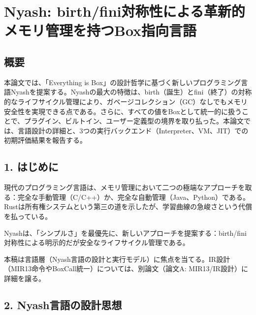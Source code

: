 \documentclass[
]{article}
\author{}
\date{}
\begin{document}
\hypertarget{nyash-birthfiniux5bfeux79f0ux6027ux306bux3088ux308bux9769ux65b0ux7684ux30e1ux30e2ux30eaux7ba1ux7406ux3092ux6301ux3064boxux6307ux5411ux8a00ux8a9e}{%
\section{Nyash:
birth/fini対称性による革新的メモリ管理を持つBox指向言語}\label{nyash-birthfiniux5bfeux79f0ux6027ux306bux3088ux308bux9769ux65b0ux7684ux30e1ux30e2ux30eaux7ba1ux7406ux3092ux6301ux3064boxux6307ux5411ux8a00ux8a9e}}

\hypertarget{ux6982ux8981}{%
\subsection{概要}\label{ux6982ux8981}}

本論文では、「Everything is
Box」の設計哲学に基づく新しいプログラミング言語Nyashを提案する。Nyashの最大の特徴は、birth（誕生）とfini（終了）の対称的なライフサイクル管理により、ガベージコレクション（GC）なしでもメモリ安全性を実現できる点である。さらに、すべての値をBoxとして統一的に扱うことで、プラグイン、ビルトイン、ユーザー定義型の境界を取り払った。本論文では、言語設計の詳細と、3つの実行バックエンド（Interpreter、VM、JIT）での初期評価結果を報告する。

\hypertarget{ux306fux3058ux3081ux306b}{%
\subsection{1. はじめに}\label{ux306fux3058ux3081ux306b}}

現代のプログラミング言語は、メモリ管理において二つの極端なアプローチを取る：完全な手動管理（C/C++）か、完全な自動管理（Java、Python）である。Rustは所有権システムという第三の道を示したが、学習曲線の急峻さという代償を払っている。

Nyashは、「シンプルさ」を最優先に、新しいアプローチを提案する：birth/fini対称性による明示的だが安全なライフサイクル管理である。

本稿は言語層（Nyash言語の設計と実行モデル）に焦点を当てる。IR設計（MIR13命令やBoxCall統一）については、別論文（論文A:
MIR13/IR設計）に詳細を譲る。

\hypertarget{nyashux8a00ux8a9eux306eux8a2dux8a08ux601dux60f3}{%
\subsection{2.
Nyash言語の設計思想}\label{nyashux8a00ux8a9eux306eux8a2dux8a08ux601dux60f3}}
\end{document}
